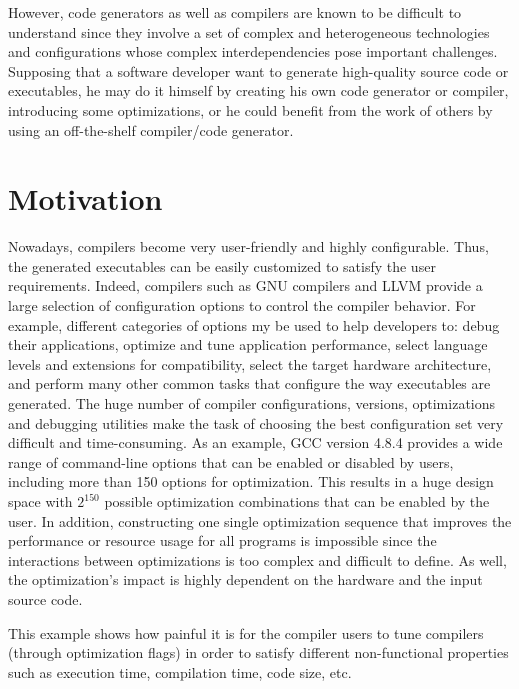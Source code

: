 However, code generators as well as compilers are known to be difficult to understand since they involve a set of complex and heterogeneous technologies and configurations whose complex interdependencies pose important challenges. 
Supposing that a software developer want to generate high-quality source code or executables, he may do it himself by creating his own code generator or compiler, introducing some optimizations, or he could benefit from the work of others by using an off-the-shelf compiler/code generator.


\section{Motivation}

Nowadays, compilers become very user-friendly and highly configurable\cite{fursin2008milepost}. Thus, the generated executables can be easily customized to satisfy the user requirements. Indeed, compilers such as GNU compilers and LLVM provide a large selection of configuration options to control the compiler behavior. For example, different categories of options my be used to help developers to: debug their applications, optimize and tune application performance, select language levels and extensions for compatibility, select the target hardware architecture, and perform many other common tasks that configure the way executables are generated.
The huge number of compiler configurations, versions, optimizations and debugging utilities make the task of choosing the best configuration set very difficult and time-consuming. As an example, GCC version 4.8.4 provides a wide range of command-line options that can be enabled or disabled by users, including more than 150 options for optimization. This results in a huge design space with $2^{150}$ possible optimization combinations that can be enabled by the user. In addition, constructing one single optimization sequence that improves the performance or resource usage for all programs is impossible since the interactions between optimizations is too complex and difficult to define. As well, the optimization's impact is highly dependent on the hardware and the input source code.


This example shows how painful it is for the compiler users to tune compilers (through optimization flags) in order to satisfy different non-functional properties such as execution time, compilation time, code size, etc.

